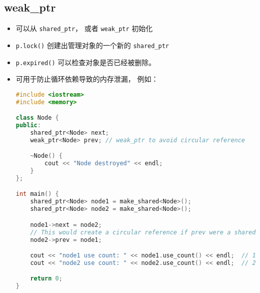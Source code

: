 \subsection{weak\_ptr}
\begin{itemize}
\item 可以从 \verb`shared_ptr`， 或者 \verb`weak_ptr` 初始化
\item \verb`p.lock()` 创建出管理对象的一个新的 \verb`shared_ptr`
\item \verb`p.expired()` 可以检查对象是否已经被删除。
\item 可用于防止循环依赖导致的内存泄漏， 例如：
\begin{lstlisting}[language=cpp]
#include <iostream>
#include <memory>

class Node {
public:
    shared_ptr<Node> next;
    weak_ptr<Node> prev; // weak_ptr to avoid circular reference

    ~Node() {
        cout << "Node destroyed" << endl;
    }
};

int main() {
    shared_ptr<Node> node1 = make_shared<Node>();
    shared_ptr<Node> node2 = make_shared<Node>();

    node1->next = node2;
    // This would create a circular reference if prev were a shared_ptr
    node2->prev = node1;

    cout << "node1 use count: " << node1.use_count() << endl;  // 1
    cout << "node2 use count: " << node2.use_count() << endl;  // 2

    return 0;
}
\end{lstlisting}
\end{itemize}
